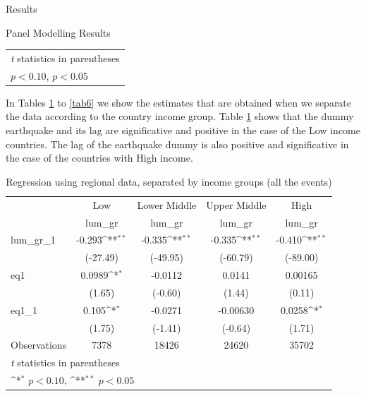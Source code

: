 \documentclass[12.5pt,fleqn,leqno,letterpaper]{article}
\begin{document}
\begin{section}{Results}
\begin{subsection}{Panel Modelling Results}
\begin{table}[H]
{\begin{tabular}{l*{8}{c}}
          \hline\hline
          \multicolumn{9}{l}{\footnotesize \textit{t} statistics in parentheses}\\
          \multicolumn{9}{l}{\footnotesize \sym{*} \(p<0.10\), \sym{**} \(p<0.05\)}\\
      \end{tabular}}
    \end{table}

    In Tables \ref{tab4} to \ref{tab6} we show the estimates that are obtained when we separate the data according to the country income group. Table \ref{tab4} shows that the dummy earthquake and its lag are significative and positive in the case of the Low income countries. The lag of the earthquake dummy is also positive and significative in the case of the countries with High income.

    \begin{table}[H]\centering
      \def\sym#1{\ifmmode^{#1}\else\(^{#1}\)\fi}
      \caption{Regression using regional data, separated by income groups (all the events)\label{tab4}}
      \begin{tabular}{l*{4}{c}}
        \hline\hline
        &\multicolumn{1}{c}{Low}&\multicolumn{1}{c}{Lower Middle}&\multicolumn{1}{c}{Upper Middle}&\multicolumn{1}{c}{High}\\
        &\multicolumn{1}{c}{lum\_gr}&\multicolumn{1}{c}{lum\_gr}&\multicolumn{1}{c}{lum\_gr}&\multicolumn{1}{c}{lum\_gr}\\
        \hline
        lum\_gr\_1            &      -0.293\sym{**}&      -0.335\sym{**}&      -0.335\sym{**}&      -0.410\sym{**}\\
                              &    (-27.49)        &    (-49.95)        &    (-60.79)        &    (-89.00)        \\
        [1em]
        eq1                 &      0.0989\sym{*} &     -0.0112        &      0.0141        &     0.00165        \\
                            &      (1.65)        &     (-0.60)        &      (1.44)        &      (0.11)        \\
        [1em]
        eq1\_1               &       0.105\sym{*} &     -0.0271        &    -0.00630        &      0.0258\sym{*} \\
                             &      (1.75)        &     (-1.41)        &     (-0.64)        &      (1.71)        \\
        \hline
        Observations        &        7378        &       18426        &       24620        &       35702        \\
        \hline\hline
        \multicolumn{5}{l}{\footnotesize \textit{t} statistics in parentheses}\\
        \multicolumn{5}{l}{\footnotesize \sym{*} \(p<0.10\), \sym{**} \(p<0.05\)}\\
      \end{tabular}
    \end{table}


\end{subsection}
\end{section}
\end{document}
